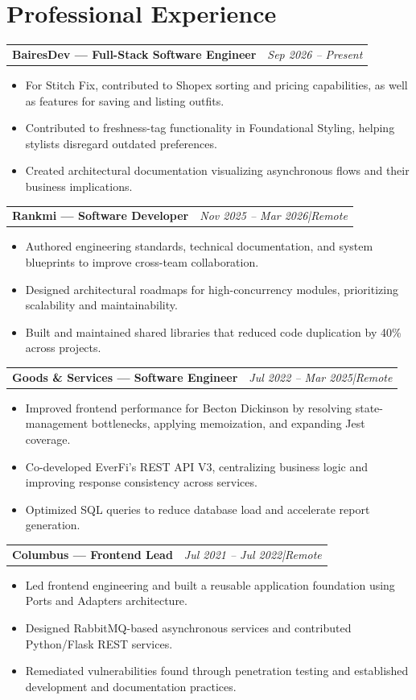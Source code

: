 \documentclass[10.5pt,a4paper]{article}
\makeatletter
\newcommand{\jobtitle}[2]{%
  \noindent
  \begin{tabularx}{\linewidth}{@{}X r@{}}
    \textbf{#1} & \textit{\small\color{muted}#2}
  \end{tabularx}\vspace{1pt}%
}
\makeatother
\begin{document}
\section{Professional Experience}

\jobtitle{BairesDev \textnormal{---} Full-Stack Software Engineer}
         {Sep 2026 -- Present}
\begin{itemize}
  \item For Stitch Fix, contributed to Shopex sorting and pricing capabilities, as well as
        features for saving and listing outfits.
  \item Contributed to freshness-tag functionality in Foundational Styling, helping stylists
        disregard outdated preferences.
  \item Created architectural documentation visualizing asynchronous flows and their business
        implications.
\end{itemize}

\jobtitle{Rankmi \textnormal{---} Software Developer}
         {Nov 2025 -- Mar 2026\enspace|\enspace Remote}
\begin{itemize}
  \item Authored engineering standards, technical documentation, and system blueprints to improve
        cross-team collaboration.
  \item Designed architectural roadmaps for high-concurrency modules, prioritizing scalability
        and maintainability.
  \item Built and maintained shared libraries that reduced code duplication by 40\% across
        projects.
\end{itemize}

\jobtitle{Goods \& Services \textnormal{---} Software Engineer}
         {Jul 2022 -- Mar 2025\enspace|\enspace Remote}
\begin{itemize}
  \item Improved frontend performance for Becton Dickinson by resolving state-management
        bottlenecks, applying memoization, and expanding Jest coverage.
  \item Co-developed EverFi's REST API V3, centralizing business logic and improving response
        consistency across services.
  \item Optimized SQL queries to reduce database load and accelerate report generation.
\end{itemize}

\jobtitle{Columbus \textnormal{---} Frontend Lead}
         {Jul 2021 -- Jul 2022\enspace|\enspace Remote}
\begin{itemize}
  \item Led frontend engineering and built a reusable application foundation using Ports and
        Adapters architecture.
  \item Designed RabbitMQ-based asynchronous services and contributed Python/Flask REST services.
  \item Remediated vulnerabilities found through penetration testing and established development
        and documentation practices.
\end{itemize}
\end{document}
